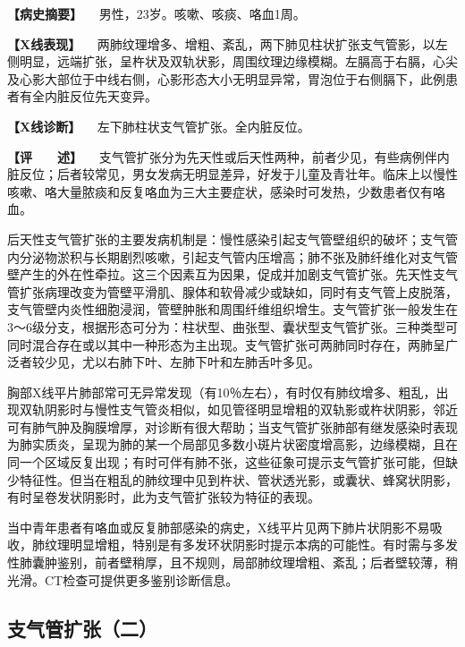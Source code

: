 \textbf{【病史摘要】} 　男性，23岁。咳嗽、咳痰、咯血1周。

\textbf{【X线表现】}
　两肺纹理增多、增粗、紊乱，两下肺见柱状扩张支气管影，以左侧明显，远端扩张，呈杵状及双轨状影，周围纹理边缘模糊。左膈高于右膈，心尖及心影大部位于中线右侧，心影形态大小无明显异常，胃泡位于右侧膈下，此例患者有全内脏反位先天变异。

\textbf{【X线诊断】} 　左下肺柱状支气管扩张。全内脏反位。

\textbf{【评　　述】}
　支气管扩张分为先天性或后天性两种，前者少见，有些病例伴内脏反位；后者较常见，男女发病无明显差异，好发于儿童及青壮年。临床上以慢性咳嗽、咯大量脓痰和反复咯血为三大主要症状，感染时可发热，少数患者仅有咯血。

后天性支气管扩张的主要发病机制是：慢性感染引起支气管壁组织的破坏；支气管内分泌物淤积与长期剧烈咳嗽，引起支气管内压增高；肺不张及肺纤维化对支气管壁产生的外在性牵拉。这三个因素互为因果，促成并加剧支气管扩张。先天性支气管扩张病理改变为管壁平滑肌、腺体和软骨减少或缺如，同时有支气管上皮脱落，支气管壁内炎性细胞浸润，管壁肿胀和周围纤维组织增生。支气管扩张一般发生在3～6级分支，根据形态可分为：柱状型、曲张型、囊状型支气管扩张。三种类型可同时混合存在或以其中一种形态为主出现。支气管扩张可两肺同时存在，两肺呈广泛者较少见，尤以右肺下叶、左肺下叶和左肺舌叶多见。

胸部X线平片肺部常可无异常发现（有10％左右），有时仅有肺纹增多、粗乱，出现双轨阴影时与慢性支气管炎相似，如见管径明显增粗的双轨影或杵状阴影，邻近可有肺气肿及胸膜增厚，对诊断有很大帮助；当支气管扩张肺部有继发感染时表现为肺实质炎，呈现为肺的某一个局部见多数小斑片状密度增高影，边缘模糊，且在同一个区域反复出现；有时可伴有肺不张，这些征象可提示支气管扩张可能，但缺少特征性。但当在粗乱的肺纹理中见到杵状、管状透光影，或囊状、蜂窝状阴影，有时呈卷发状阴影时，此为支气管扩张较为特征的表现。

当中青年患者有咯血或反复肺部感染的病史，X线平片见两下肺片状阴影不易吸收，肺纹理明显增粗，特别是有多发环状阴影时提示本病的可能性。有时需与多发性肺囊肿鉴别，前者壁稍厚，且不规则，局部肺纹理增粗、紊乱；后者壁较薄，稍光滑。CT检查可提供更多鉴别诊断信息。

\subsection{支气管扩张（二）}

